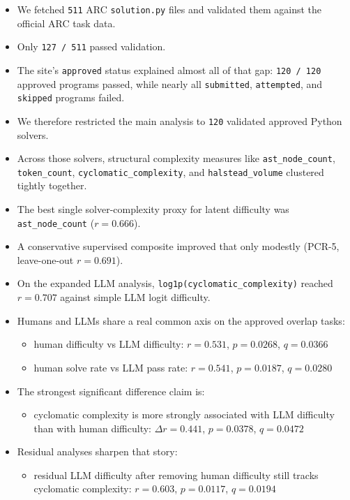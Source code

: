 \documentclass[11pt]{article}
\begin{document}
\begin{itemize}
  \item We fetched \texttt{511} ARC \texttt{solution.py} files and validated them against the official ARC task data.
  \item Only \texttt{127 / 511} passed validation.
  \item The site's \texttt{approved} status explained almost all of that gap: \texttt{120 / 120} approved programs passed, while nearly all \texttt{submitted}, \texttt{attempted}, and \texttt{skipped} programs failed.
  \item We therefore restricted the main analysis to \texttt{120} validated approved Python solvers.
  \item Across those solvers, structural complexity measures like \texttt{ast\_node\_count}, \texttt{token\_count}, \texttt{cyclomatic\_complexity}, and \texttt{halstead\_volume} clustered tightly together.
  \item The best single solver-complexity proxy for latent difficulty was \texttt{ast\_node\_count} ($r = 0.666$).
  \item A conservative supervised composite improved that only modestly (PCR-5, leave-one-out $r = 0.691$).
  \item On the expanded LLM analysis, \texttt{log1p(cyclomatic\_complexity)} reached $r = 0.707$ against simple LLM logit difficulty.
  \item Humans and LLMs share a real common axis on the approved overlap tasks:
  \begin{itemize}
    \item human difficulty vs LLM difficulty: $r = 0.531$, $p = 0.0268$, $q = 0.0366$
    \item human solve rate vs LLM pass rate: $r = 0.541$, $p = 0.0187$, $q = 0.0280$
  \end{itemize}
  \item The strongest significant difference claim is:
  \begin{itemize}
    \item cyclomatic complexity is more strongly associated with LLM difficulty than with human difficulty: $\Delta r = 0.441$, $p = 0.0378$, $q = 0.0472$
  \end{itemize}
  \item Residual analyses sharpen that story:
  \begin{itemize}
    \item residual LLM difficulty after removing human difficulty still tracks cyclomatic complexity: $r = 0.603$, $p = 0.0117$, $q = 0.0194$

\end{itemize}
\end{itemize}
\end{document}
